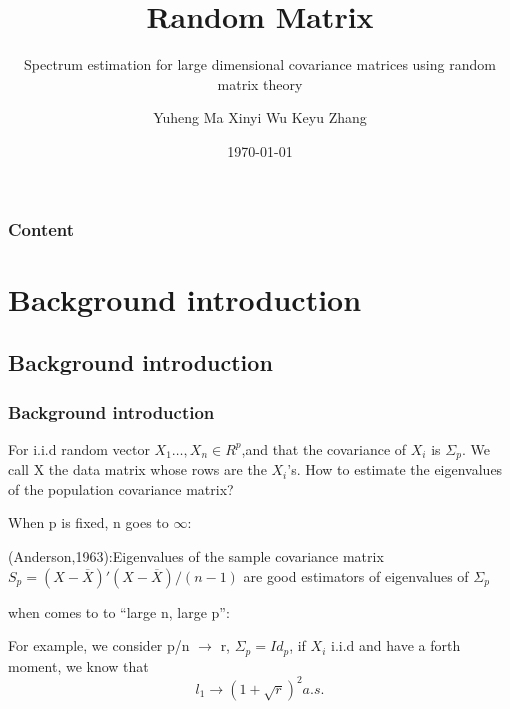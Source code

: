 \documentclass[aspectratio=169, 10pt, utf8, mathserif]{beamer}
\begin{document}

\title{Random Matrix
}
\subtitle{Spectrum estimation for large dimensional covariance matrices using random matrix theory}
\author{Yuheng Ma\hspace{3em}      
	Xinyi Wu \hspace{3em}
	Keyu Zhang}

\date{\today}
\begin{frame}
    \titlepage
\end{frame}

\begin{frame}
	\frametitle{Content}
	\tableofcontents[hideallsubsections]
\end{frame}

\section{Background introduction}
\subsection{Background introduction}
\begin{frame}
	\frametitle{Background introduction}
For i.i.d random vector $X_1\dots,X_n\in R^p$,and that the covariance of $X_i$ is $\Sigma_p$. We call X the data matrix whose rows are the $X_i$’s. How to estimate the eigenvalues of the population covariance matrix?

When p is fixed, n goes to $\infty$:

(Anderson,1963):Eigenvalues of the sample covariance matrix $S_p=(X-\overline{X})'(X-\overline{X})/(n-1)$ are good estimators of eigenvalues of $\Sigma_p$

 when comes to to “large n, large p”:
 
 For example, we consider p/n $\rightarrow$ r, $\Sigma_p=Id_p$, if $X_i$ i.i.d and have a forth moment, we know that \[l_1\rightarrow (1+\sqrt{r})^2 a.s.\]
\end{frame}
\end{document}
